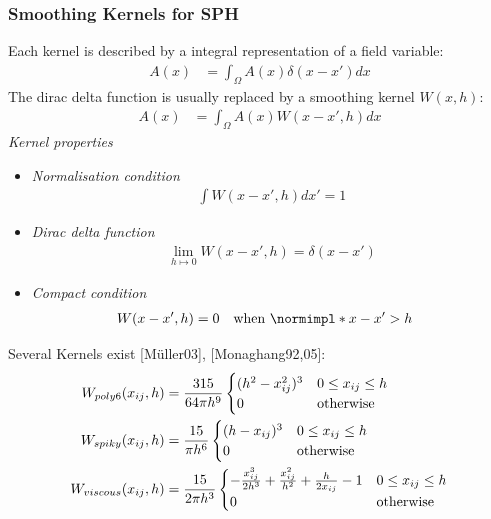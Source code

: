 \begin{multicols}{2}
\subsubsection{Smoothing Kernels for SPH}
Each kernel is described by a integral representation of a field variable:
\begin{align*}
	A(x) &= \int_\Omega A(x)\delta(x-x')dx
\end{align*}
The dirac delta function is usually replaced by a smoothing kernel $W(x,h)$:
\begin{align*}
		A(x) &= \int_\Omega A(x)W(x-x', h)dx
\end{align*}
\emph{Kernel properties}
\begin{itemize}
	\item \emph{Normalisation condition}
		\begin{align*}
			\int W(x-x',h) dx' = 1
		\end{align*}
	\item \emph{Dirac delta function}
		\begin{align*}
			\lim_{h\mapsto 0} W(x-x', h) = \delta (x-x')
		\end{align*}
	\item \emph{Compact condition}
		\begin{align*}
			W(x-x', h) &= 0 \quad \text{when }\norm{x-x'} > h 
		\end{align*}
\end{itemize}

Several Kernels exist [Müller03], [Monaghang92,05]:
\begin{align*}
	W_{poly6} (x_{ij}, h) &= {315\over 64\pi h^9} 
			\begin{cases}
				(h^2-x_{ij}^2)^3 & 0\leq x_{ij} \leq h\\
				0 & \text{otherwise}
			\end{cases}\\
	W_{spiky} (x_{ij}, h) &= {15\over\pi h^6} 
			\begin{cases}
				(h-x_{ij})^3 & 0\leq x_{ij} \leq h\\
				0 & \text{otherwise}
			\end{cases}\\
	W_{viscous} (x_{ij}, h) &= {15\over 2\pi h^3} 
			\begin{cases}
				-{x_{ij}^3 \over 2h^3} + {x_{ij}^2 \over h^2} + {h\over 2x_{ij}}-1
					 & 0\leq x_{ij} \leq h\\
				0 & \text{otherwise}
			\end{cases}
\end{align*}


\end{multicols}
